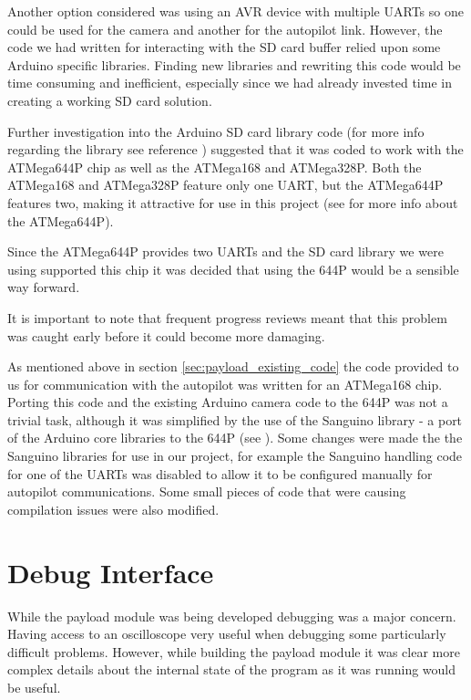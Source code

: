 Another option considered was using an AVR device with multiple UARTs so one 
could be used for the camera and another for the autopilot link. However, 
the code we had written for interacting with the SD card buffer relied upon 
some Arduino specific libraries. Finding new libraries and rewriting this code 
would be time consuming and inefficient, especially since we had already 
invested time in creating a working SD card solution.

Further investigation into the Arduino SD card library code (for more info
regarding the library see reference \cite{arduino_sd_library}) suggested that
it was coded to work with the ATMega644P chip as well as the ATMega168 and
ATMega328P. Both the ATMega168 and ATMega328P feature only one UART, but the 
ATMega644P features two, making it attractive for use in this project (see
\cite{atmega644p} for more info about the ATMega644P).

Since the ATMega644P provides two UARTs and the SD card library we were using
supported this chip it was decided that using the 644P would be a sensible 
way forward. 

It is important to note that frequent progress reviews meant that this problem
was caught early before it could become more damaging.

As mentioned above in section \ref{sec:payload_existing_code} the code provided
to us for communication with the autopilot was written for an ATMega168 chip. 
Porting this code and the existing Arduino camera code to the 644P was not a 
trivial task, although it was simplified by the use of the Sanguino library -
a port of the Arduino core libraries to the 644P (see \cite{sanguino}). Some 
changes were made the the Sanguino libraries for use in our project, for 
example the Sanguino handling code for one of the UARTs was disabled to allow
it to be configured manually for autopilot communications. Some small pieces
of code that were causing compilation issues were also modified.

\section{Debug Interface}
\label{sec:payload_debug_interface}
While the payload module was being developed debugging was a major concern. 
Having access to an oscilloscope very useful when debugging some particularly 
difficult problems.
However, while building the payload module it was clear more complex details 
about the internal state of the program as it was running would be useful.

